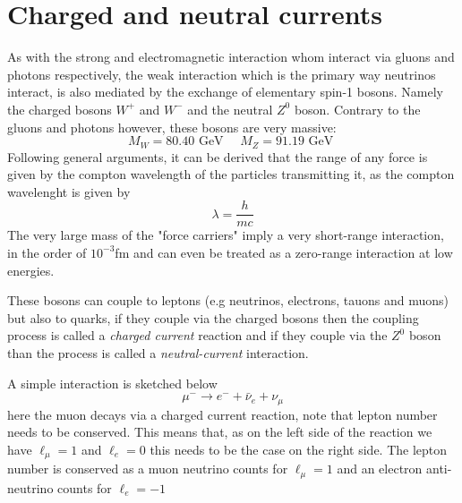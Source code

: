 \documentclass[11pt,a4paper,faculty=we,language=en,doctype=report]{cls/ugent-doc}
\begin{document}
\section{Charged and neutral currents}
As with the strong and electromagnetic interaction whom interact via gluons
and photons respectively, the weak interaction which is the primary way
neutrinos interact, is also mediated by the exchange of elementary spin-1
bosons.  Namely the charged bosons $W^+$ and $W^-$ and the neutral $Z^0$ boson.
Contrary to the gluons and photons however, these bosons are very massive:
\begin{equation}
  M_W = 80.40\text{ GeV }\quad M_Z = 91.19\text{ GeV }
\end{equation}
Following general arguments, it can be derived that the
range of any force is given by the compton wavelength of the particles transmitting it\cite{martin2017particle},
as the compton wavelenght is given by 
\begin{equation}
  \lambda = \frac{h}{mc}
\end{equation}
The very large mass of the "force carriers" imply a very short-range
interaction, in the order of $10^{-3}$fm and can even be treated as a
zero-range interaction at low energies.

These bosons can couple to leptons (e.g neutrinos, electrons, tauons and muons)
but also to quarks, if they couple via the charged bosons then the coupling process
is called a \textit{charged current} reaction and if they couple via the $Z^0$ boson
than the process is called a \textit{neutral-current} interaction.

A simple interaction is sketched below
\begin{equation}
  \mu^- \rightarrow e^- + \bar{\nu}_e + \nu_\mu
\end{equation}
here the muon decays via a charged current reaction, note that lepton number needs to be conserved.
This means that, as on the left side of the reaction we have $\ell_\mu = 1$ and $\ell_e = 0$ this needs
to be the case on the right side. The lepton number is conserved as a muon neutrino counts for $\ell_\mu = 1$
and an electron anti-neutrino counts for $\ell_e = -1$
\end{document}
